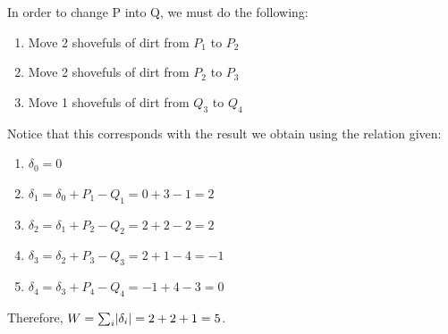 \begin{enumerate}
{{    In order to change P into Q, we must do the following: 
    \begin{enumerate}
        \item Move 2 shovefuls of dirt from $P_{1}$ to $P_{2}$
        \item Move 2 shovefuls of dirt from $P_{2}$ to $P_{3}$
        \item Move 1 shovefuls of dirt from $Q_{3}$ to $Q_{4}$
    \end{enumerate}
    
    Notice that this corresponds with the result we obtain using the relation given:
    \begin{enumerate}
        \item $\delta_{0} = 0$
        \item $\delta_{1} = \delta_{0} + P_{1} - Q_{1} = 0 + 3 - 1 = 2$
        \item $\delta_{2} = \delta_{1} + P_{2} - Q_{2} = 2 + 2 - 2 = 2$
        \item $\delta_{3} = \delta_{2} + P_{3} - Q_{3} = 2 + 1 - 4 = -1$
        \item $\delta_{4} = \delta_{3} + P_{4} - Q_{4} = -1 + 4 - 3 = 0$
    \end{enumerate}
    Therefore, $W = \sum_{i} \abs{\delta_{i}} = 2 + 2 + 1 = 5$.
    }
    
}
\end{enumerate}
